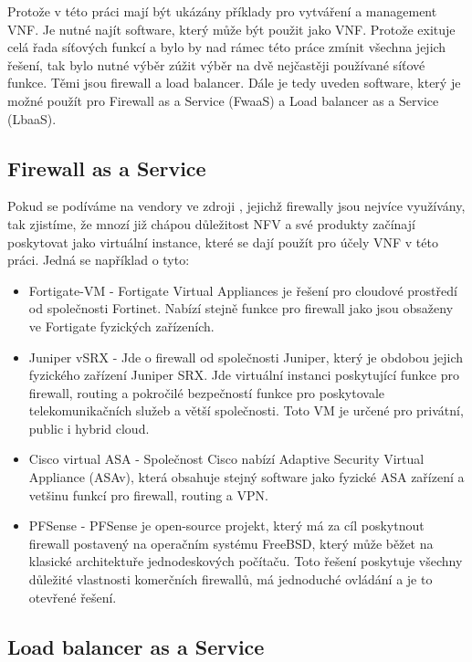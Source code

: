 Protože v této práci mají být ukázány příklady pro vytváření a management VNF. Je nutné najít software, který může být použit jako VNF. Protože exituje celá řada síťových funkcí a bylo by nad rámec této práce zmínit všechna jejich řešení, tak bylo nutné výběr zúžit výběr na dvě nejčastěji používané síťové funkce. Těmi jsou firewall a load balancer. Dále je tedy uveden software, který je možné použít pro Firewall as a Service (FwaaS) a Load balancer as a Service (LbaaS).

\subsection{Firewall as a Service}

Pokud se podíváme na vendory ve zdroji \cite{firewalls} , jejichž firewally jsou nejvíce využívány, tak zjistíme, že mnozí již chápou důležitost NFV a své produkty začínají poskytovat jako virtuální instance, které se dají použít pro účely VNF v této práci. Jedná se například o tyto:

\begin{itemize}
\item Fortigate-VM - Fortigate Virtual Appliances je řešení pro cloudové prostředí od společnosti Fortinet. Nabízí stejně funkce pro firewall jako jsou obsaženy ve Fortigate fyzických zařízeních. \cite{fortigate}
\item Juniper vSRX - Jde o firewall od společnosti Juniper, který je obdobou jejich fyzického zařízení Juniper SRX. Jde virtuální instanci poskytující funkce pro firewall, routing a pokročilé bezpečností funkce pro poskytovale telekomunikačních služeb a větší společnosti. Toto VM je určené pro privátní, public i hybrid cloud. \cite{juniper}
\item Cisco virtual ASA - Společnost Cisco nabízí Adaptive Security Virtual Appliance (ASAv), která obsahuje stejný software jako fyzické ASA zařízení a vetšinu funkcí pro firewall, routing a VPN. \cite{cisco}
\item PFSense - PFSense je open-source projekt, který má za cíl poskytnout firewall postavený na operačním systému FreeBSD, který může běžet na klasické architektuře jednodeskových počítaču. Toto řešení poskytuje všechny důležité vlastnosti komerčních firewallů, má jednoduché ovládání a je to otevřené řešení. \cite{pfsense}
\end{itemize} 

\subsection{Load balancer as a Service}

